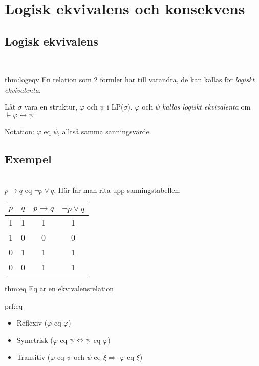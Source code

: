 \section{Logisk ekvivalens och konsekvens}

\subsection{Logisk ekvivalens}\hfill\\

\begin{theo}{thm:logeqv}
  En relation som 2 formler har till varandra, de kan kallas för \textit{logiskt ekvivalenta}.
  \par\bigskip
  \noindent Låt $\sigma$ vara en struktur, $\varphi$ och $\psi$ i LP($\sigma$). $\varphi$ och $\psi$ \textit{kallas logiskt ekvivalenta} om $\vDash\varphi\leftrightarrow\psi$
  \par\bigskip
  \noindent Notation: $\varphi$ eq $\psi$, alltså samma sanningsvärde.
\end{theo}

\subsection{Exempel}\hfill\\

\noindent $p\rightarrow q$ eq $\neg p\vee q$. Här får man rita upp sanningstabellen:

\begin{center}
  \begin{tabular}{|c|c|c|c|}
    \hline
    $p$&$q$&$p\rightarrow q$&$\neg p\vee q$\\
    \hline
    1&1&1&1\\
    \hline
    1&0&0&0\\
    \hline
    0&1&1&1\\
    \hline
    0&0&1&1\\
    \hline
  \end{tabular}
\end{center}

\begin{theo}[Eq]{thm:eq}
  Eq är en ekvivalensrelation
\end{theo}
\par\bigskip

\begin{prf}[Eq]{prf:eq}
  \begin{itemize}
    \item Reflexiv ($\varphi$ eq $\varphi$)
    \item Symetrisk ($\varphi$ eq $\psi \Leftrightarrow\psi$ eq $\varphi$)
    \item Transitiv ($\varphi$ eq $\psi$ och $\psi$ eq $\xi\Rightarrow$ $\varphi$ eq $\xi$)
  \end{itemize}
\end{prf}
\par\bigskip

